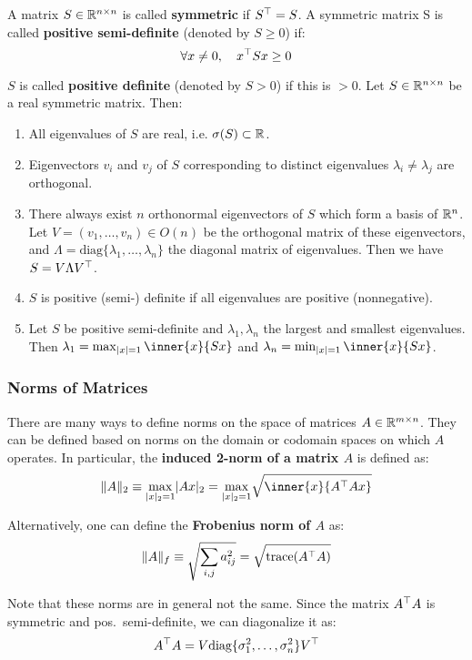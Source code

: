 A matrix $S \in \mathbb{R}^{n \times n}$ is called \textbf{symmetric} if $S^{\top} = S$.
A symmetric matrix S is called \textbf{positive semi-definite}
(denoted by $S \ge 0$) if:
	\[\forall x \ne 0, \quad x^{\top}Sx \ge 0\]

$S$ is called \textbf{positive definite} (denoted by $S>0$) if this is $>0$.
Let $S \in \mathbb{R}^{n \times n}$ be a real symmetric matrix. Then:
\begin{enumerate}
	\item All eigenvalues of $S$ are real, i.e. $\sigma(S) \subset \mathbb{R}$.
	\item Eigenvectors $v_i$ and $v_j$ of $S$ corresponding to distinct
		eigenvalues $\lambda_i \ne \lambda_j$ are orthogonal.
	\item There always exist $n$ orthonormal eigenvectors of $S$
		which form a basis of $\mathbb{R}^n$.
		Let $V = (v_1, \ldots, v_n) \in O(n)$ be the orthogonal matrix
		of these eigenvectors, and
		$\Lambda = \text{diag}\{\lambda_1, \ldots, \lambda_n\}$ the diagonal
		matrix of eigenvalues. Then we have $S = V \Lambda V^{\top}$.
	\item $S$ is positive (semi-) definite if all eigenvalues are
		positive (nonnegative).
	\item Let $S$ be positive semi-definite and $\lambda_1, \lambda_n$ the largest
		and smallest eigenvalues. Then $\lambda_1 = \max_{|x|=1} \inner{x}{Sx}$
		and $\lambda_n = \min_{|x|=1} \inner{x}{Sx}$.
	
\end{enumerate}


\subsubsection{Norms of Matrices}%
\label{ssub:norms_of_matrices}

There are many ways to define norms on the space of matrices $A \in \mathbb{R}^{m \times{} n}$.
They can be defined based on norms on the domain or codomain spaces
on which $A$ operates. In particular, the
\textbf{induced 2-norm of a matrix $A$} is defined as:
	\[\|A\|_2 \equiv \underset{|x|_2=1}{\max} |Ax|_2
	= \underset{|x|_2=1}{\max} \sqrt{\inner{x}{\tr{A}Ax}}\]

Alternatively, one can define the \textbf{Frobenius norm of $A$} as:
	\[\|A\|_f \equiv \sqrt{\sum_{i,j}a^2_{ij}}
	= \sqrt{\text{trace}(A^{\top}A)}\]

Note that these norms are in general not the same.
Since the matrix $A^{\top}A$ is symmetric and pos.\ semi-definite,
we can diagonalize it as:
\[A^{\top}A = V \text{diag}\{\sigma^2_1, \ldots, \sigma^2_n\}V^{\top}\]

